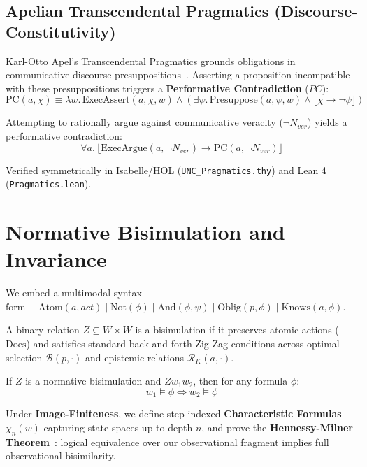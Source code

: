 \documentclass[runningheads]{llncs}
\begin{document}
\subsection{Apelian Transcendental Pragmatics (Discourse-Constitutivity)}
Karl-Otto Apel's Transcendental Pragmatics grounds obligations in communicative discourse presuppositions~\cite{apel1980transformation}. Asserting a proposition incompatible with these presuppositions triggers a \textbf{Performative Contradiction} ($PC$):
\[
\text{PC}(a, \chi) \equiv \lambda w.\, \text{ExecAssert}(a, \chi, w) \wedge (\exists \psi.\, \text{Presuppose}(a, \psi, w) \wedge \lfloor \chi \rightarrow \mathbf{\neg}\psi \rfloor)
\]
\begin{theorem}
Attempting to rationally argue against communicative veracity ($\neg N_{ver}$) yields a performative contradiction:
\[
\forall a.\, \lfloor \text{ExecArgue}(a, \mathbf{\neg}N_{ver}) \rightarrow \text{PC}(a, \mathbf{\neg}N_{ver}) \rfloor
\]
\end{theorem}
Verified symmetrically in Isabelle/HOL (\texttt{UNC\_Pragmatics.thy}) and Lean 4 (\texttt{Pragmatics.lean}).

\section{Normative Bisimulation and Invariance}

We embed a multimodal syntax $\text{form} \equiv \text{Atom}(a, act) \mid \text{Not}(\phi) \mid \text{And}(\phi, \psi) \mid \text{Oblig}(p, \phi) \mid \text{Knows}(a, \phi)$.
\begin{definition}
A binary relation $Z \subseteq W \times W$ is a bisimulation if it preserves atomic actions ($\text{Does}$) and satisfies standard back-and-forth Zig-Zag conditions across optimal selection $\mathcal{B}(p, \cdot)$ and epistemic relations $\mathcal{R}_K(a, \cdot)$.
\end{definition}

\begin{theorem}
If $Z$ is a normative bisimulation and $Z w_1 w_2$, then for any formula $\phi$:
\[
w_1 \models \phi \iff w_2 \models \phi
\]
\end{theorem}

Under \textbf{Image-Finiteness}, we define step-indexed \textbf{Characteristic Formulas} $\chi_n(w)$ capturing state-spaces up to depth $n$, and prove the \textbf{Hennessy-Milner Theorem}~\cite{hennessy1985algebraic}: logical equivalence over our observational fragment implies full observational bisimilarity.
\end{document}
